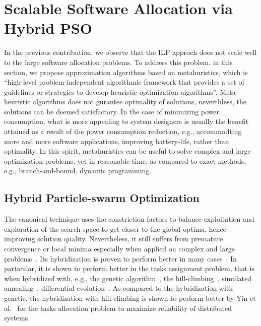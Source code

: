 \section{Scalable Software Allocation via Hybrid PSO}\label{rc_pso}
In the previous contribution, we observe that the ILP approch does not scale well to the large software allocation problems. To address this problem, in this section, we propose approximation algorithms based on metahuristics, which is ``high-level problem-independent algorithmic framework that provides a set of guidelines or strategies to develop heuristic optimization algorithms''. Meta-heuristic algorithms does not gurantee optimality of solutions, neverthless, the solutions can be deemed satisfactory. In the case of minimizing power consumption, what is more appealing to system designers is usually the benefit attained as a result of the power consumption reduction, e.g., accommodting more and more software applications, improving battery-life, rather than optimality. In this spirit, metahuristics can be useful to solve complex and large optimization problems, yet in reasonable time, as compared to exact methods, e.g., branch-and-bound, dynamic programming.

\subsection{Hybrid Particle-swarm Optimization}
The canonical \pso{} technique uses the constriction factors to balance exploitation and exploration of the search space to get closer to the global optima, hence improving solution quality. Nevertheless, it still suffers from premature convergence or local minima especially when applied on complex and large problems~\cite{Rini2011ParticleChallenges}. Its hybridization is proven to perform better in many cases~\cite{Sengupta2018ParticlePerspectives}. In particular, it is shown to perform better in the tasks assignment problem, that is when hybridized with, e.g., the genetic algorithm~\cite{Sailer2013OptimizingAUTOSAR}, the hill-climbing~\cite{yin2007task}, simulated annealing~\cite{Zhao2007ASystem}, differential evolution~\cite{Tasgetiren2006AProblem}. As compared to the hybridization with genetic, the hybridization with hill-climbing \hcpso{} is shown to perform better by Yin et al.~\cite{yin2007task} for the tasks allocation problem to maximize reliability of distributed systems. 

